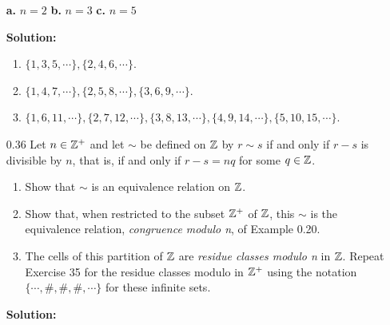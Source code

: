 \begin{enumerate}
               \textbf{a.} $n = 2$
               \qquad\qquad\qquad
               \textbf{b.} $n = 3$
               \qquad\qquad\qquad
               \textbf{c.} $n = 5$

      \textbf{Solution:}

      \begin{enumerate}
         \item $\{1, 3, 5, \cdots\}, \{2, 4, 6, \cdots\}$.
         \item $\{1, 4, 7, \cdots\}, \{2, 5, 8, \cdots\}, \{3, 6, 9, \cdots\}$.
         \item $\{1, 6, 11, \cdots\}, \{2, 7, 12, \cdots\},
               \{3, 8, 13, \cdots\}, \{4, 9, 14, \cdots\},
               \{5, 10, 15, \cdots\}$.
      \end{enumerate}
   \item[0.36] Let $n \in \mathbb{Z}^+$ and let $\sim$ be defined on $\mathbb{Z}$ by $r \sim s$
               if and only if $r - s$ is divisible by $n$, that is, if and only
               if $r - s = nq$ for some $q \in \mathbb{Z}$.

      \begin{enumerate}
         \item Show that $\sim$ is an equivalence relation on $\mathbb{Z}$.
         \item Show that, when restricted to the subset $\mathbb{Z}^+$ of $\mathbb{Z}$,
               this $\sim$ is the equivalence relation,
               \textit{congruence modulo n}, of Example 0.20.
         \item The cells of this partition of $\mathbb{Z}$ are
               \textit{residue classes modulo n} in $\mathbb{Z}$. Repeat Exercise 35 for
               the residue classes modulo in $\mathbb{Z}^+$ using the notation
               $\{\cdots, \#, \#, \#, \cdots\}$ for these infinite sets.
      \end{enumerate}

      \textbf{Solution:}


\end{enumerate}
